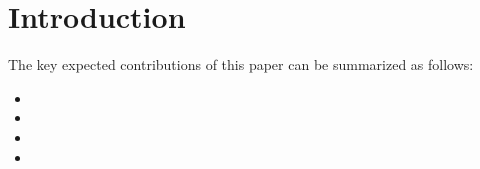 
\section{Introduction}


\cite{aw2018analyzing}
\cite{javarone2018bitcoin}
\cite{kumar2016edge}
\cite{yan2018periphery}





The key expected contributions of this paper can be summarized as follows:
\vspace{-2pt}
\begin{itemize}
 \denseitems
 \item 
 \item 
 
\item 

 \item 

 
\end{itemize}
